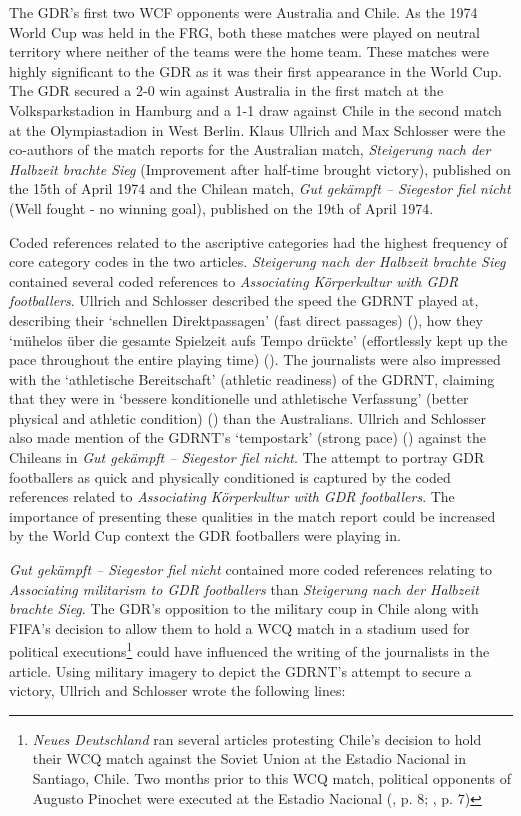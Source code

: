 The GDR’s first two WCF opponents were Australia and Chile. As the 1974 World Cup was held in the FRG, both these matches were played on neutral territory where neither of the teams were the home team. These matches were highly significant to the GDR as it was their first appearance in the World Cup. The GDR secured a 2-0 win against Australia in the first match at the Volksparkstadion in Hamburg and a 1-1 draw against Chile in the second match at the Olympiastadion in West Berlin. Klaus Ullrich and Max Schlosser were the co-authors of the match reports for the Australian match, \textit{Steigerung nach der Halbzeit brachte Sieg} (Improvement after half-time brought victory), published on the 15th of April 1974 and the Chilean match, \textit{Gut gekämpft – Siegestor fiel nicht} (Well fought - no winning goal), published on the 19th of April 1974.

Coded references related to the ascriptive categories had the highest frequency of core category codes in the two articles. \textit{Steigerung nach der Halbzeit brachte Sieg} contained several coded references to \textit{Associating Körperkultur with GDR footballers}. Ullrich and Schlosser described the speed the GDRNT played at, describing their ‘schnellen Direktpassagen’ (fast direct passages) (\cite{nd19740615}), how they ‘mühelos über die gesamte Spielzeit aufs Tempo drückte’ (effortlessly kept up the pace throughout the entire playing time) (\cite{nd19740615}). The journalists were also impressed with the ‘athletische Bereitschaft’ (athletic readiness) of the GDRNT, claiming that they were in ‘bessere konditionelle und athletische Verfassung’ (better physical and athletic condition) (\cite{nd19740615}) than the Australians. Ullrich and Schlosser also made mention of the GDRNT’s ‘tempostark’ (strong pace) (\cite{nd19740619}) against the Chileans in \textit{Gut gekämpft – Siegestor fiel nicht}. The attempt to portray GDR footballers as quick and physically conditioned is captured by the coded references related to \textit{Associating Körperkultur with GDR footballers}. The importance of presenting these qualities in the match report could be increased by the World Cup context the GDR footballers were playing in.

\textit{Gut gekämpft – Siegestor fiel nicht} contained more coded references relating to \textit{Associating militarism to GDR footballers} than \textit{Steigerung nach der Halbzeit brachte Sieg}. The GDR’s opposition to the military coup in Chile along with FIFA’s decision to allow them to hold a WCQ match in a stadium used for political executions\footnote{\textit{Neues Deutschland} ran several articles protesting Chile’s decision to hold their WCQ match against the Soviet Union at the Estadio Nacional in Santiago, Chile. Two months prior to this WCQ match, political opponents of Augusto Pinochet were executed at the Estadio Nacional (\cite{nd19731104a}, p. 8; \cite{nd19731112}, p. 7)} could have influenced the writing of the journalists in the article. Using military imagery to depict the GDRNT’s attempt to secure a victory, Ullrich and Schlosser wrote the following lines:


